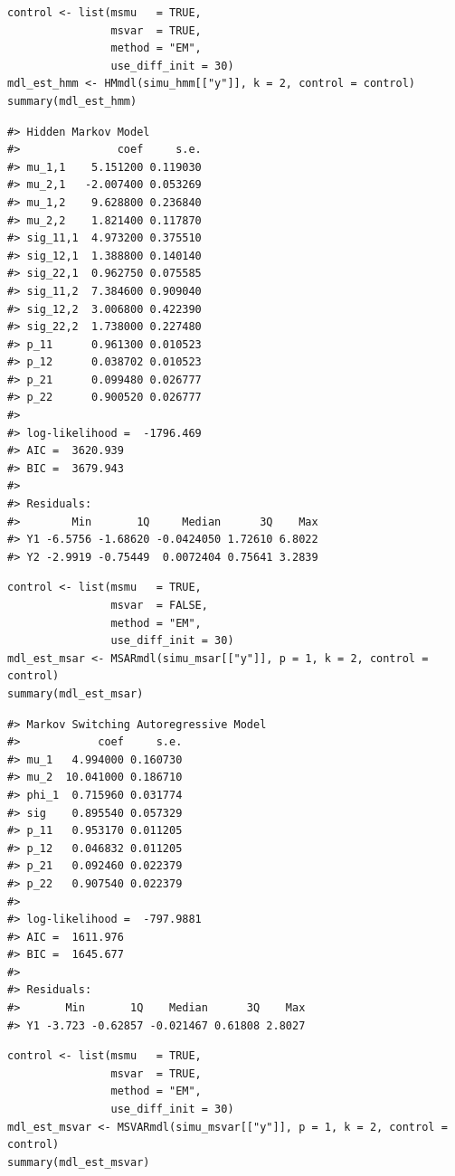 \begin{verbatim}
control <- list(msmu   = TRUE, 
                msvar  = TRUE,
                method = "EM",
                use_diff_init = 30)
mdl_est_hmm <- HMmdl(simu_hmm[["y"]], k = 2, control = control)
summary(mdl_est_hmm)
\end{verbatim}

\begin{verbatim}
#> Hidden Markov Model
#>               coef     s.e.
#> mu_1,1    5.151200 0.119030
#> mu_2,1   -2.007400 0.053269
#> mu_1,2    9.628800 0.236840
#> mu_2,2    1.821400 0.117870
#> sig_11,1  4.973200 0.375510
#> sig_12,1  1.388800 0.140140
#> sig_22,1  0.962750 0.075585
#> sig_11,2  7.384600 0.909040
#> sig_12,2  3.006800 0.422390
#> sig_22,2  1.738000 0.227480
#> p_11      0.961300 0.010523
#> p_12      0.038702 0.010523
#> p_21      0.099480 0.026777
#> p_22      0.900520 0.026777
#> 
#> log-likelihood =  -1796.469
#> AIC =  3620.939
#> BIC =  3679.943
#> 
#> Residuals:
#>        Min       1Q     Median      3Q    Max
#> Y1 -6.5756 -1.68620 -0.0424050 1.72610 6.8022
#> Y2 -2.9919 -0.75449  0.0072404 0.75641 3.2839
\end{verbatim}

\begin{verbatim}
control <- list(msmu   = TRUE, 
                msvar  = FALSE, 
                method = "EM",
                use_diff_init = 30)
mdl_est_msar <- MSARmdl(simu_msar[["y"]], p = 1, k = 2, control = control)
summary(mdl_est_msar)
\end{verbatim}

\begin{verbatim}
#> Markov Switching Autoregressive Model
#>            coef     s.e.
#> mu_1   4.994000 0.160730
#> mu_2  10.041000 0.186710
#> phi_1  0.715960 0.031774
#> sig    0.895540 0.057329
#> p_11   0.953170 0.011205
#> p_12   0.046832 0.011205
#> p_21   0.092460 0.022379
#> p_22   0.907540 0.022379
#> 
#> log-likelihood =  -797.9881
#> AIC =  1611.976
#> BIC =  1645.677
#> 
#> Residuals:
#>       Min       1Q    Median      3Q    Max
#> Y1 -3.723 -0.62857 -0.021467 0.61808 2.8027
\end{verbatim}

\begin{verbatim}
control <- list(msmu   = TRUE, 
                msvar  = TRUE,
                method = "EM",
                use_diff_init = 30)
mdl_est_msvar <- MSVARmdl(simu_msvar[["y"]], p = 1, k = 2, control = control)
summary(mdl_est_msvar)
\end{verbatim}

